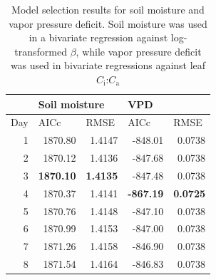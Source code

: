 \newpage
\begin{table}
    \centering
    \caption[Model selection results for soil moisture and vapor pressure deficit]{Model selection results for soil moisture and vapor pressure deficit. Soil moisture was used in a bivariate regression against log-transformed $\beta$, while vapor pressure deficit was used in bivariate regressions against leaf $C_\mathrm{i}$:$C_\mathrm{a}$}
    \label{tab:tab.c4}
        \begin{tabular}{p{0.75cm}p{1.5cm}p{1.5cm}p{1.5cm}p{1.5cm}}
            & \multicolumn{2}{l}{Soil moisture} & \multicolumn{2}{l}{VPD} \\
            \hline
            Day & AICc              & RMSE              & AICc              & RMSE   \\
            \hline
            \multicolumn{1}{r}{1}  & \multicolumn{1}{r}{1870.80}            & \multicolumn{1}{r}{1.4147}            & \multicolumn{1}{r}{-848.01}           & \multicolumn{1}{r}{0.0738} \\
            \multicolumn{1}{r}{2}  & \multicolumn{1}{r}{1870.12}            & \multicolumn{1}{r}{1.4136}            & \multicolumn{1}{r}{-847.68}           & \multicolumn{1}{r}{0.0738} \\
            \multicolumn{1}{r}{3} & \multicolumn{1}{r}{\textbf{1870.10}}   & \multicolumn{1}{r}{\textbf{1.4135}}   & \multicolumn{1}{r}{-847.48}           & \multicolumn{1}{r}{0.0738} \\
            \multicolumn{1}{r}{4}  & \multicolumn{1}{r}{1870.37}            & \multicolumn{1}{r}{1.4141}            & \multicolumn{1}{r}{\textbf{-867.19}}  & \multicolumn{1}{r}{\textbf{0.0725}} \\
            \multicolumn{1}{r}{5}  & \multicolumn{1}{r}{1870.76}            & \multicolumn{1}{r}{1.4148}            & \multicolumn{1}{r}{-847.10}           & \multicolumn{1}{r}{0.0738} \\
            \multicolumn{1}{r}{6}  & \multicolumn{1}{r}{1870.99}            & \multicolumn{1}{r}{1.4153}            & \multicolumn{1}{r}{-847.00}           & \multicolumn{1}{r}{0.0738} \\
            \multicolumn{1}{r}{7}  & \multicolumn{1}{r}{1871.26}            & \multicolumn{1}{r}{1.4158}            & \multicolumn{1}{r}{-846.90}           & \multicolumn{1}{r}{0.0738} \\
            \multicolumn{1}{r}{8}  & \multicolumn{1}{r}{1871.54}            & \multicolumn{1}{r}{1.4164}            & \multicolumn{1}{r}{-846.83}           & \multicolumn{1}{r}{0.0738} \\

\end{tabular}
\end{table}
